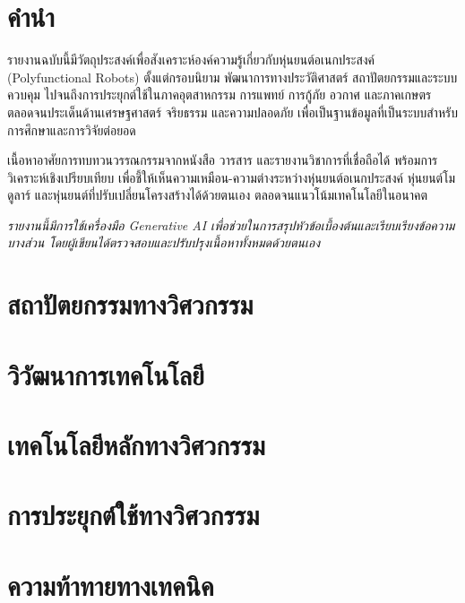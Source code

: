 \documentclass[a4paper]{article}
\begin{document}
\newpage

\tableofcontents
\newpage

\setcounter{page}{1}

\section*{คำนำ}
รายงานฉบับนี้มีวัตถุประสงค์เพื่อสังเคราะห์องค์ความรู้เกี่ยวกับหุ่นยนต์อเนกประสงค์ (Polyfunctional Robots) ตั้งแต่กรอบนิยาม พัฒนาการทางประวัติศาสตร์ สถาปัตยกรรมและระบบควบคุม ไปจนถึงการประยุกต์ใช้ในภาคอุตสาหกรรม การแพทย์ การกู้ภัย อวกาศ และภาคเกษตร ตลอดจนประเด็นด้านเศรษฐศาสตร์ จริยธรรม และความปลอดภัย เพื่อเป็นฐานข้อมูลที่เป็นระบบสำหรับการศึกษาและการวิจัยต่อยอด

เนื้อหาอาศัยการทบทวนวรรณกรรมจากหนังสือ วารสาร และรายงานวิชาการที่เชื่อถือได้ พร้อมการวิเคราะห์เชิงเปรียบเทียบ เพื่อชี้ให้เห็นความเหมือน-ความต่างระหว่างหุ่นยนต์อเนกประสงค์ หุ่นยนต์โมดูลาร์ และหุ่นยนต์ที่ปรับเปลี่ยนโครงสร้างได้ด้วยตนเอง ตลอดจนแนวโน้มเทคโนโลยีในอนาคต

{\itshape รายงานนี้มีการใช้เครื่องมือ Generative AI เพื่อช่วยในการสรุปหัวข้อเบื้องต้นและเรียบเรียงข้อความบางส่วน โดยผู้เขียนได้ตรวจสอบและปรับปรุงเนื้อหาทั้งหมดด้วยตนเอง}

\section{สถาปัตยกรรมทางวิศวกรรม}

\section{วิวัฒนาการเทคโนโลยี}

\section{เทคโนโลยีหลักทางวิศวกรรม}

\section{การประยุกต์ใช้ทางวิศวกรรม}

\section{ความท้าทายทางเทคนิค}
\end{document}
